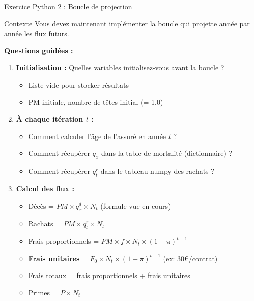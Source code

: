 \documentclass[10pt,aspectratio=169]{beamer}
\newcommand{\highlight}[1]{\textbf{\color{rougeactu}#1}}
\begin{document}
\begin{frame}{Exercice Python 2 : Boucle de projection}
\begin{block}{Contexte}
Vous devez maintenant implémenter la boucle qui projette année par année les flux futurs.
\end{block}

\textbf{Questions guidées :}
\begin{enumerate}
    \item \textbf{Initialisation :} Quelles variables initialisez-vous avant la boucle ?
    \begin{itemize}
        \item Liste vide pour stocker résultats
        \item PM initiale, nombre de têtes initial (= 1.0)
    \end{itemize}
    
    \item \textbf{À chaque itération $t$ :}
    \begin{itemize}
        \item Comment calculer l'âge de l'assuré en année $t$ ?
        \item Comment récupérer $q_x$ dans la table de mortalité (dictionnaire) ?
        \item Comment récupérer $q^r_t$ dans le tableau numpy des rachats ?
    \end{itemize}
    
    \item \textbf{Calcul des flux :}
    \begin{itemize}
        \item Décès = $PM \times q_x^d \times N_t$ (formule vue en cours)
        \item Rachats = $PM \times q_t^r \times N_t$
        \item Frais proportionnels = $PM \times f \times N_t \times (1 + \pi)^{t-1}$
        \item \highlight{Frais unitaires} = $F_0 \times N_t \times (1 + \pi)^{t-1}$ (ex: 30€/contrat)
        \item Frais totaux = frais proportionnels + frais unitaires
        \item Primes = $P \times N_t$
    \end{itemize}
\end{enumerate}
\end{frame}
\end{document}
